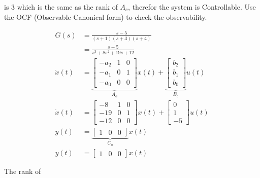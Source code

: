 \documentclass[main.tex]{subfiles}
\begin{document}
\begin{enumerate}
\begin{enumerate}
        is 3 which is the same as the rank of $A_c$, therefor the system is Controllable. Use the OCF (Observable Canonical form) to check the observability.

        $$
        \begin{aligned}
        G(s) &= \frac{s-5}{(s+1)(s+3)(s+4)}\\
        &= \frac{s-5}{s^3+8 s^2+19 s+12}\\
        \dot{x}(t) &= \underbrace{\left[\begin{array}{lll}
        -a_2 & 1 & 0 \\
        -a_1 & 0 & 1 \\
        -a_0 & 0 & 0
        \end{array}\right]}_{A_o} x(t)+\underbrace{\left[\begin{array}{l}
        b_2 \\
        b_1 \\
        b_0
        \end{array}\right]}_{B_o} u(t) \\
        \dot{x}(t) &= \left[\begin{array}{lll}
        -8 & 1 & 0 \\
        -19 & 0 & 1 \\
        -12 & 0 & 0
        \end{array}\right] x(t) + \left[\begin{array}{l}
        0 \\
        1 \\
        -5
        \end{array}\right] u(t) \\
        y(t) &= \underbrace{\left[\begin{array}{lll}
        1 & 0 & 0
        \end{array}\right]}_{C_o} x(t) \\
        y(t) &= \left[\begin{array}{lll}
        1 & 0 & 0
        \end{array}\right] x(t)
        \end{aligned}
        $$
        
        The rank of
        

\end{enumerate}
\end{enumerate}
\end{document}
